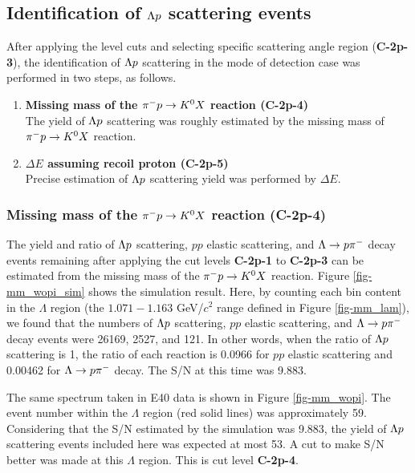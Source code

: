 \clearpage
\subsection{Identification of $\Lambda p$ scattering events}
\label{sec-2p_wo_id}

After applying the  level cuts and selecting specific scattering angle region ({\bf C-2p-3}), the identification of $\Lambda p$ scattering in the  mode of detection case  was performed in two steps, as follows. 

\begin{enumerate}
  \item {\bf Missing mass of the $\pi^- p \to K^0 X$ reaction ({\bf C-2p-4}) } \\
  The yield of $\Lambda p$ scattering was roughly estimated by the missing mass of $\pi^- p \to K^0 X$ reaction.
  \item {\bf $\Delta E$ assuming recoil proton ({\bf C-2p-5}) } \\
  Precise estimation of $\Lambda p$ scattering yield was performed by $\Delta E$.
\end{enumerate}

\subsubsection{Missing mass of the $\pi^- p \to K^0 X$ reaction ({\bf C-2p-4})}

The yield and ratio of $\Lambda p$ scattering, $pp$ elastic scattering, and $\Lambda\to p\pi^{-}$ decay events remaining after applying the cut levels {\bf C-2p-1} to {\bf C-2p-3} can be estimated from the missing mass of the $\pi^- p \to K^0 X$ reaction. Figure \ref{fig-mm_wopi_sim} shows the simulation result. Here, by counting each bin content in the $\Lambda$ region (the $1.071-1.163$ GeV/$c^{2}$ range defined in Figure \ref{fig-mm_lam}), we found that the numbers of $\Lambda p$ scattering, $pp$ elastic scattering, and $\Lambda\to p\pi^{-}$ decay events were 26169, 2527, and 121. In other words, when the ratio of $\Lambda p$ scattering is 1, the ratio of each reaction is 0.0966 for $pp$ elastic scattering and 0.00462 for $\Lambda\to p\pi^{-}$ decay. The S/N at this time was 9.883.

The same spectrum taken in E40 data is shown in Figure \ref{fig-mm_wopi}. The event number within the $\Lambda$ region (red solid lines) was approximately 59. Considering that the S/N estimated by the simulation was 9.883, the yield of $\Lambda p$ scattering events included here was expected at most 53. A cut to make S/N better was made at this $\Lambda$ region. This is cut level {\bf C-2p-4}.

